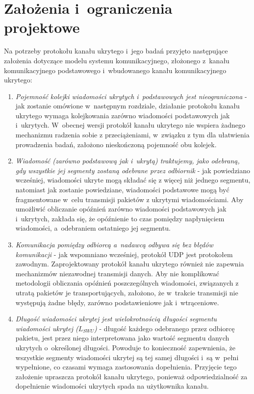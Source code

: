 \documentclass[a4paper, twoside, 12pt]{report}
\begin{document}
    \section{Założenia i~ograniczenia projektowe}
    Na potrzeby protokołu kanału ukrytego i~jego badań przyjęto następujące założenia
    dotyczące modelu systemu komunikacyjnego, złożonego z~kanału komunikacyjnego
    podstawowego i~wbudowanego kanału komunikacyjnego ukrytego:
    \begin{enumerate}
        \item \emph{Pojemność kolejki wiadomości ukrytych i~podstawowych jest nieograniczona} -
            jak zostanie omówione w~następnym rozdziale, działanie protokołu
            kanału ukrytego wymaga kolejkowania zarówno wiadomości podstawowych
            jak i~ukrytych. W~obecnej wersji protokół kanału ukrytego nie wspiera
            żadnego mechanizmu radzenia sobie z przeciążeniami, w~związku z tym
            dla ułatwienia prowadzenia badań, założono nieskończoną pojemność obu kolejek.

        \item \emph{Wiadomość (zarówno podstawową jak i~ukrytą) traktujemy, jako odebraną,
            gdy wszystkie jej segmenty zostaną odebrane przez odbiornik} - jak powiedziano
            wcześniej, wiadomości ukryte mogą składać się z więcej niż jednego segmentu,
            natomiast jak zostanie powiedziane, wiadomości podstawowe mogą być fragmentowane
            w~celu transmisji pakietów z ukrytymi wiadomościami. Aby umożliwić
            obliczanie opóźnień zarówno wiadomości podstawowych jak i~ukrytych,
            zakłada się, że opóźnienie to czas pomiędzy napłynięciem wiadomości,
            a~odebraniem ostatniego jej segmentu.

        \item \emph{Komunikacja pomiędzy odbiorcą a~nadawcą odbywa się bez błędów komunikacji} -
            jak wspomniano wcześniej, protokół UDP jest protokołem zawodnym.
            Zaprojektowany protokół kanału ukrytego również nie zapewnia mechanizmów niezawodnej
            transmisji danych. Aby nie komplikować metodologii
            obliczania opóźnień poszczególnych wiadomości, związanych z utratą
            pakietów je transportujących, założono, że w~trakcie transmisji nie
            występują żadne błędy, zarówno podstawieniowe jak i~wtrąceniowe.

        \item \emph{Długość wiadomości ukrytej jest wielokrotnością długości segmentu
            wiadomości ukrytej (\(L_{SWU}\))} - długość każdego odebranego przez odbiorcę pakietu,
            jest przez niego interpretowana jako wartość segmentu danych ukrytych o~określonej
            długości. Powoduje to konieczność zapewnienia, że wszystkie segmenty
            wiadomości ukrytej są tej samej długości i~są w~pełni wypełnione, co czasami
            wymaga zastosowania dopełnienia. Przyjęcie tego założenie upraszcza protokół
            kanału ukrytego, ponieważ odpowiedzialność za dopełnienie wiadomości ukrytych
            spada na użytkownika kanału.
    \end{enumerate}
\end{document}
